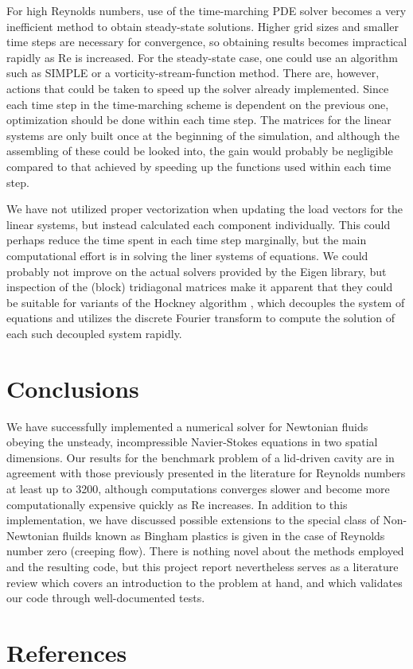 \documentclass[final,3p,twocolumn]{elsarticle}
\begin{document}
For high Reynolds numbers, use of the time-marching PDE solver becomes a very
inefficient method to obtain steady-state solutions. Higher grid sizes and
smaller time steps are necessary for convergence, so obtaining results becomes
impractical rapidly as Re is increased. For the steady-state case, one could
use an algorithm such as SIMPLE or a vorticity-stream-function method.  There
are, however, actions that could be taken to speed up the solver already
implemented. Since each time step in the time-marching scheme is dependent on
the previous one, optimization should be done within each time step. The
matrices for the linear systems are only built once at the beginning of the
simulation, and although the assembling of these could be looked into, the gain
would probably be negligible compared to that achieved by speeding up the
functions used within each time step. 

We have not utilized proper vectorization when updating the load vectors for
the linear systems, but instead calculated each component individually. This
could perhaps reduce the time spent in each time step marginally, but the main
computational effort is in solving the liner systems of equations. We could
probably not improve on the actual solvers provided by the Eigen library, but
inspection of the (block) tridiagonal matrices make it apparent that they could
be suitable for variants of the Hockney algorithm \cite{hockney1965fast}, which
decouples the system of equations and utilizes the discrete Fourier transform
to compute the solution of each such decoupled system rapidly. 

\section{Conclusions}
\label{sec:conclusion}

We have successfully implemented a numerical solver for Newtonian fluids
obeying the unsteady, incompressible Navier-Stokes equations in two spatial
dimensions. Our results for the benchmark problem of a lid-driven cavity are in
agreement with those previously presented in the literature for Reynolds
numbers at least up to 3200, although computations converges slower and become
more computationally expensive quickly as Re increases.  In addition to this
implementation, we have discussed possible extensions to the special class of
Non-Newtonian fluilds known as Bingham plastics is given in the case of
Reynolds number zero (creeping flow). There is nothing novel about the methods
employed and the resulting code, but this project report nevertheless serves as
a literature review which covers an introduction to the problem at hand, and
which validates our code through well-documented tests. 

\section*{References}


\end{document}
